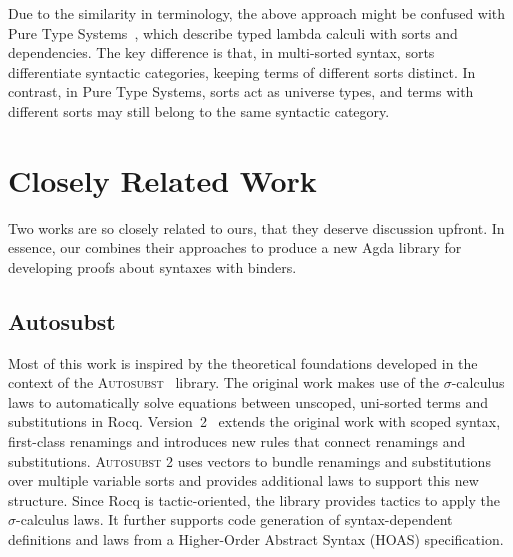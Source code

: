 \documentclass[screen,nonacm]{acmart}
\begin{document}
Due to the similarity in terminology, the above approach might be confused with
Pure Type Systems~\cite{berardi1988towards, barendregt1990types,
      terlouw1989een}, which describe typed lambda calculi with sorts and
dependencies. The key difference is that, in multi-sorted syntax, sorts
differentiate syntactic categories, keeping terms of different sorts distinct.
In contrast, in Pure Type Systems, sorts act as universe types, and terms with
different sorts may still belong to the same syntactic category.

\section{Closely Related Work}\label{sec:rel}
Two works are so closely related to ours, that they deserve discussion upfront.
In essence, our combines their approaches to produce a new Agda library for
developing proofs about syntaxes with binders.

\subsection{Autosubst}
Most of this work is inspired by the theoretical foundations developed in the
context of the \textsc{Autosubst}~\cite{schafer2015autosubst} library. The
original work makes use of the $σ$-calculus laws to automatically solve
equations between unscoped, uni-sorted terms and substitutions in Rocq.
Version~2~\cite{10.1145/3293880.3294101} extends the original work with scoped
syntax, first-class renamings and introduces new rules that connect renamings
and substitutions. \textsc{Autosubst 2} uses vectors to bundle renamings and
substitutions over multiple variable sorts and provides additional laws to
support this new structure. Since Rocq is tactic-oriented, the library provides
tactics to apply the $σ$-calculus laws. It further supports code generation of
syntax-dependent definitions and laws from a Higher-Order Abstract Syntax
(HOAS) specification.
\end{document}
